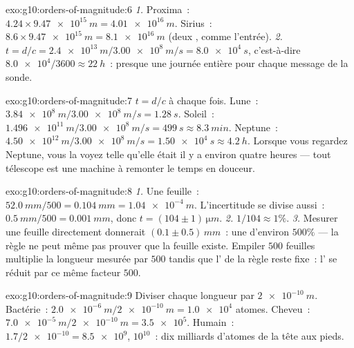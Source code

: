 \begin{solution}{exo:g10:orders-of-magnitude:6}
\emph{1.} Proxima~:
$4.24 \times \qty{9.47e15}{m} = \qty{4.01e16}{m}$. Sirius~:
$8.6 \times \qty{9.47e15}{m} = \qty{8.1e16}{m}$ (deux , comme l'entrée).
\emph{2.} $t = d/c = \qty{2.4e13}{m} / \qty{3.00e8}{m/s}
= \qty{8.0e4}{s}$, c'est-à-dire $\num{8.0e4}/3600 \approx \qty{22}{h}$~:
presque une journée entière pour chaque message de la sonde.
\end{solution}

\begin{solution}{exo:g10:orders-of-magnitude:7}
$t = d/c$ à chaque fois. Lune~:
$\qty{3.84e8}{m}/\qty{3.00e8}{m/s} = \qty{1.28}{s}$. Soleil~:
$\qty{1.496e11}{m}/\qty{3.00e8}{m/s} = \qty{499}{s} \approx
\qty{8.3}{min}$. Neptune~:
$\qty{4.50e12}{m}/\qty{3.00e8}{m/s} = \qty{1.50e4}{s} \approx
\qty{4.2}{h}$. Lorsque vous regardez Neptune, vous la voyez telle
qu'elle était il y a environ quatre heures --- tout télescope est une
machine à remonter le temps en douceur.
\end{solution}

\begin{solution}{exo:g10:orders-of-magnitude:8}
\emph{1.} Une feuille~: $\qty{52.0}{mm}/500 = \qty{0.104}{mm}
= \qty{1.04e-4}{m}$. L'incertitude se divise aussi~:
$\qty{0.5}{mm}/500 = \qty{0.001}{mm}$, donc
$t = (104 \pm 1)\,\unit{\micro m}$.
\emph{2.} $1/104 \approx 1\%$.
\emph{3.} Mesurer une feuille directement donnerait
$(0.1 \pm 0.5)\,\unit{mm}$~: une  d'environ
$500\%$ --- la règle ne peut même pas prouver que la feuille existe.
Empiler $500$ feuilles multiplie la longueur mesurée par $500$ tandis
que l' de la règle reste fixe~: l' se réduit par ce même facteur $500$.
\end{solution}

\begin{solution}{exo:g10:orders-of-magnitude:9}
Diviser chaque longueur par $\qty{2e-10}{m}$. Bactérie~:
$\qty{2.0e-6}{m}/\qty{2e-10}{m} = \num{1.0e4}$ atomes. Cheveu~:
$\qty{7.0e-5}{m}/\qty{2e-10}{m} = \num{3.5e5}$. Humain~:
$1.7/\num{2e-10} = \num{8.5e9}$,  $10^{10}$~: dix
milliards d'atomes de la tête aux pieds.
\end{solution}

